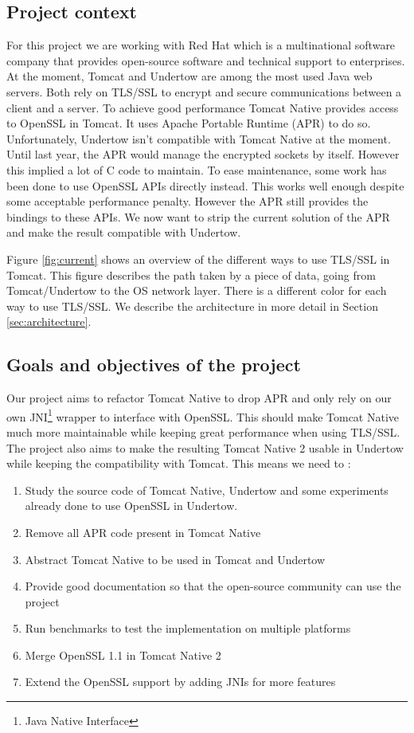 \documentclass[11pt,a4paper,bibliography=totocnumbered]{scrartcl}
\def\mytitle{Tomcat Native 2}
\def\theclient{Red Hat}
\begin{document}
\subsection{Project context}
For this project we are working with \theclient{} which is a multinational software company that provides open-source software and technical support to enterprises\autocite{redhat}.
At the moment, Tomcat\autocite{tomcat} and Undertow\autocite{undertow} are among the most used Java web servers. Both rely on TLS/SSL to encrypt and secure communications between a client and a server. To achieve good performance Tomcat Native\autocite{tomcat-native} provides access to OpenSSL in Tomcat. It uses Apache Portable Runtime (APR) to do so. 
Unfortunately, Undertow isn't compatible with Tomcat Native at the moment.
Until last year, the APR would manage the encrypted sockets by itself. However this implied a lot of C code to maintain. To ease maintenance, some work has been done to use OpenSSL APIs directly instead. This works well enough despite some acceptable performance penalty. However the APR still provides the bindings to these APIs.
We now want to strip the current solution of the APR and make the result compatible with Undertow.

Figure \ref{fig:current} shows an overview of the different ways to use TLS/SSL in Tomcat. This figure describes the path taken by a piece of data, going from Tomcat/Undertow to the OS network layer. There is a different color for each way to use TLS/SSL. We describe the architecture in more detail in Section \ref{sec:architecture}.

\subsection{Goals and objectives of the project}

Our project aims to refactor Tomcat Native to drop APR and only rely on our own JNI\footnote{Java Native Interface} wrapper to interface with OpenSSL. This should make Tomcat Native much more maintainable while keeping great performance when using TLS/SSL. The project also aims to make the resulting \mytitle{} usable in Undertow while keeping the compatibility with Tomcat.
This means we need to :
\begin{enumerate}
\item Study the source code of Tomcat Native, Undertow and some experiments already done to use OpenSSL in Undertow.
\item Remove all APR code present in Tomcat Native
\item Abstract Tomcat Native to be used in Tomcat and Undertow
\item Provide good documentation so that the open-source community can use the project
\item Run benchmarks to test the implementation on multiple platforms
\item Merge OpenSSL 1.1 in \mytitle{}
\item Extend the OpenSSL support by adding JNIs for more features
\end{enumerate}
\end{document}

